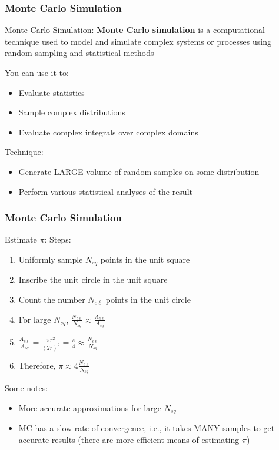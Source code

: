 \documentclass{beamer}
\begin{document}
\begin{frame}	
	\frametitle{Monte Carlo Simulation}
	
	\begin{block}{Monte Carlo Simulation:}
		\textbf{Monte Carlo simulation} is a computational technique used to model and simulate complex systems or processes using random sampling and statistical methods
		
		\vspace{10pt}
		You can use it to:
		\begin{itemize}
			\item Evaluate statistics
			\item Sample complex distributions
			\item Evaluate complex integrals over complex domains
		\end{itemize}
		
		\vspace{10pt}
		Technique:
		\begin{itemize}
			\item Generate LARGE volume of random samples on some distribution
			\item Perform various statistical analyses of the result
		\end{itemize}
	\end{block}
	
\end{frame}

\begin{frame}	
	\frametitle{Monte Carlo Simulation}
	
	\begin{exampleblock}{Estimate $\pi$:}
		\small
		Steps:
		\begin{enumerate}[label={\arabic*.}]
			\small
			\item Uniformly sample $N_{sq}$ points in the unit square
			\item Inscribe the unit circle in the unit square
			\item Count the number $N_{c\ell}$ points in the unit circle
			\item For large $N_{sq}$, \quad $\frac{N_{c\ell}}{N_{sq}}\approx\frac{A_{c\ell}}{A_{sq}}$
			\item $\frac{A_{c\ell}}{A_{sq}}=\frac{\pi r^2}{(2r)^2}=\frac{\pi}{4} \approx \frac{N_{c\ell}}{N_{sq}}$
			\item Therefore, $\pi \approx 4\frac{N_{c\ell}}{N_{sq}}$
		\end{enumerate}
		
		Some notes:
		\begin{itemize}
			\small
			\item More accurate approximations for large $N_{sq}$
			\item MC has a slow rate of convergence, i.e., it takes MANY samples to get accurate results (there are more efficient means of estimating $\pi$)
		\end{itemize}
	\end{exampleblock}
	
\end{frame}
\end{document}
